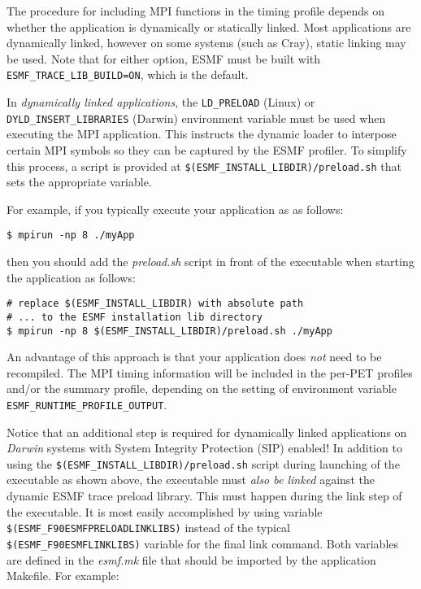 The procedure for including MPI
functions in the timing profile depends on whether the application is
dynamically or statically linked. Most applications are dynamically linked,
however on some systems (such as Cray), static linking may be used.
Note that for either option, ESMF must be built with {\tt ESMF\_TRACE\_LIB\_BUILD=ON},
which is the default.

In {\em dynamically linked applications}, the {\tt LD\_PRELOAD} (Linux) or
{\tt DYLD\_INSERT\_LIBRARIES} (Darwin) environment variable must be used when
executing the MPI application.  This instructs the dynamic loader to interpose
certain MPI symbols so they can be captured by the ESMF profiler.  To simplify
this process, a script is provided at {\tt \$(ESMF\_INSTALL\_LIBDIR)/preload.sh}
that sets the appropriate variable.

For example, if you typically execute your application as as follows:

\begin{verbatim}
$ mpirun -np 8 ./myApp
\end{verbatim}

then you should add the {\em preload.sh} script in front of the
executable when starting the application as follows:

\begin{verbatim}
# replace $(ESMF_INSTALL_LIBDIR) with absolute path
# ... to the ESMF installation lib directory
$ mpirun -np 8 $(ESMF_INSTALL_LIBDIR)/preload.sh ./myApp
\end{verbatim}

An advantage of this approach is that your application does {\em not} need to
be recompiled. The MPI timing information will be included in the per-PET profiles and/or the summary
profile, depending on the setting of environment variable
{\tt ESMF\_RUNTIME\_PROFILE\_OUTPUT}.

Notice that an additional step is required for dynamically linked applications
on {\em Darwin} systems with System Integrity Protection (SIP) enabled! In
addition to using the {\tt \$(ESMF\_INSTALL\_LIBDIR)/preload.sh} script during
launching of the executable as shown above, the executable must {\em also be
linked} against the dynamic ESMF trace preload library. This must happen during
the link step of the executable. It is most easily accomplished by using
variable {\tt \$(ESMF\_F90ESMFPRELOADLINKLIBS)} instead of the typical
{\tt \$(ESMF\_F90ESMFLINKLIBS)} variable for the final link command. Both
variables are defined in the {\em esmf.mk} file that should be imported by
the application Makefile. For example:

